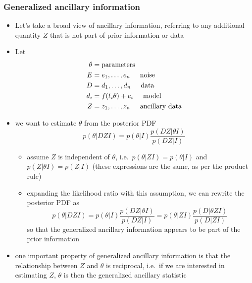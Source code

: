 \documentclass[../jaynes_prob_theory_notes.tex]{subfiles}
\begin{document}
            \subsubsection{Generalized ancillary information}
                \begin{itemize}
                    \item Let's take a broad view of ancillary information, referring to any additional quantity $Z$ that is not part of prior information or data
                    \item Let
                        \begin{align}
                            \label{anc_defs}
                            \theta &= \mathrm{parameters} \\
                            E &= e_1, \ldots, e_n \hspace{0.5cm} \mathrm{noise} \\
                            D &= d_1, \ldots, d_n \hspace{0.5cm} \mathrm{data} \\
                            d_i &= f(t_{i}{\theta}) + e_i \hspace{0.5cm} \mathrm{model} \\
                            Z &= z_1, \ldots, z_n \hspace{0.5cm} \mathrm{ancillary~data}
                        \end{align}
                    \item we want to estimate $\theta$ from the posterior PDF
                        \begin{equation*}
                            p({\theta}|DZI) = p({\theta}|I) \frac{p(DZ|{\theta}I)}{p(DZ|I)}
                        \end{equation*}
                        \begin{itemize}
                            \item assume $Z$ is independent of $\theta$, i.e.\ $p({\theta}|ZI) = p({\theta}|I)$ and $p(Z|{\theta}I) = p(Z|I)$ (these expressions are the same, as per the product rule)
                            \item expanding the likelihood ratio with this assumption, we can rewrite the posterior PDF as
                                \begin{equation*}
                                     p({\theta}|DZI) = p({\theta}|I) \frac{p(DZ|{\theta}I)}{p(DZ|I)}= p({\theta}|ZI) \frac{p(D|{\theta}ZI)}{p(D|ZI)}
                                \end{equation*}
                                so that the generalized ancillary information appears to be part of the prior information
                        \end{itemize}
                    \item one important property of generalized ancillary information is that the relationship between $Z$ and $\theta$ is reciprocal, i.e.\ if we are interested in estimating $Z$, $\theta$ is then the generalized ancillary statistic
                \end{itemize}
\end{document}
